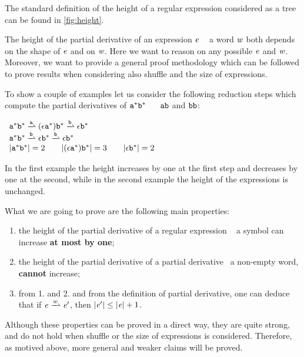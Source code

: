 The standard definition of the height of a regular expression considered as a tree can be found in \cref{fig:height}.

The height of the partial derivative of an expression $\mathit {e}$  \wrt~ a word $\mathit {w}$ both depends on the shape of $\mathit {e}$ and on $\mathit {w}$.
Here we want to reason on any possible $\mathit {e}$ and $\mathit {w}$. Moreover, we want to provide a general proof methodology which can be followed to prove results when considering also shuffle and the size of expressions.

To show a couple of examples let us consider the following reduction steps which compute the partial derivatives of ${\mathtt {a}}^*{\mathtt {b}}^*$~
\wrt~ $\mathtt {a}\mathtt {b}$ and $\mathtt {b}\mathtt {b}$:
\begin{flushleft}
 $
  \begin{array}{l}
   \starop{\sym}\catop\starop{\asym}\parDer{\sym}(\eps\catop\starop{\sym})\catop\starop{\asym}\parDer{\asym}\eps\catop\starop{\asym} \\
   \starop{\sym}\catop\starop{\asym}\parDer{\asym}\eps\catop\starop{\asym}\parDer{\asym}\eps\catop\starop{\asym}                     \\
   \theight{\starop{\sym}\catop\starop{\asym}}=2\qquad \theight{(\eps\catop\starop{\sym})\catop\starop{\asym}}=3 \qquad \theight{\eps\catop\starop{\asym}}=2
  \end{array}
 $
\end{flushleft}
In the first example the height increases by one at the first step and decreases by one at the second, while in the second example the height of the expressions is unchanged.

What we are going to prove are the following main properties:
\begin{enumerate}
 \item the height of the partial derivative of a regular expression \wrt~ a symbol can increase \textbf{at most by one};
 \item the height of the partial derivative of a partial derivative \wrt~a non-empty word, \textbf{cannot} increase;
 \item from 1. and 2. and from the definition of partial derivative, one can deduce that if $\re\parDer{\word}\re'$, then ${\mid}{\mathit {e}'}{\mid}\leq{\mid}{\ensuremath{\mathit {e}}}{\mid}+1$.
\end{enumerate}
Although these properties can be proved in a direct way, they are quite strong, and do not hold when shuffle or the size of expressions is considered. Therefore, as motived above, more general and weaker claims will be proved.

